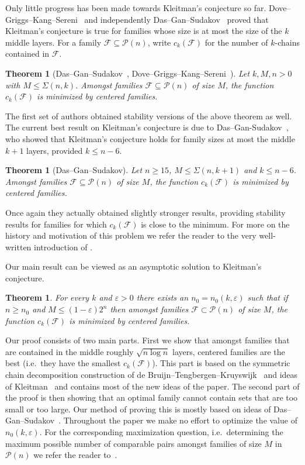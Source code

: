 \documentclass[12pt]{article}
\newtheorem{thm}[theorem]{Theorem}
\numberwithin{equation}{section}
\def\F{\mathcal{F}}
\def\P{\mathcal{P}}
\def\eps{\varepsilon}
\begin{document}
Only little progress has been made towards Kleitman's conjecture so far. Dove--Griggs--Kang--Sereni~\cite{griggs} and independently Das--Gan--Sudakov~\cite{dasgansuda} proved that Kleitman's conjecture is true for families whose size is at most the size of the $k$ middle layers. For a family $\F\subseteq \P(n)$, write $c_k(\F)$ for the number of $k$-chains contained in $\F$.
\begin{thm}[Das--Gan--Sudakov~\cite{dasgansuda}, Dove--Griggs--Kang--Sereni~\cite{griggs}]
Let $k,M,n>0$ with $M\leq \Sigma(n,k)$. Amongst families $\F\subseteq \P(n)$ of size $M$, the function $c_k(\F)$ is minimized by centered families.
\end{thm}
The first set of authors obtained stability versions of the above theorem as well. The current best result on Kleitman's conjecture is due to Das--Gan-Sudakov~\cite{dasgansuda}, who showed that Kleitman's conjecture holds for family sizes at most the middle $k+1$ layers, provided $k\leq n-6$.
\begin{thm}[\label{dasgansudakovthm}Das--Gan--Sudakov]
Let $n\geq 15$, $M\leq \Sigma(n,k+1)$ and $k\leq n-6$. Amongst families $\F\subseteq \P(n)$ of size $M$, the function $c_k(\F)$ is minimized by centered families.
\end{thm}
Once again they actually obtained slightly stronger results, providing stability results for families for which $c_k(\F)$ is close to the minimum. For more on the history and motivation of this problem we refer the reader to the very well-written introduction of \cite{dasgansuda}. 

Our main result can be viewed as an asymptotic solution to Kleitman's conjecture.
\begin{thm}\label{mainthm}
For every $k$ and $\eps>0$ there exists an $n_0=n_0(k,\eps)$ such that if $n\geq n_0$ and $M\leq (1-\eps)2^n$ then amongst families $\F\subset \P(n)$ of size $M$,  the function $c_k(\F)$ is minimized by centered families.
\end{thm}
Our proof consists of two main parts. First we show that amongst families that are contained in the middle roughly $\sqrt{n\log n}$ layers, centered families are the best (i.e.~they have the smallest $c_k(\F)$). This part is based on the symmetric chain decomposition construction of de Bruijn--Tengbergen--Kruyswijk~\cite{scd} and ideas of Kleitman~\cite{kleitmanpermu} and contains most of the new ideas of the paper. The second part of the proof is then showing that an optimal family cannot contain sets that are too small or too large. Our method of proving this is mostly based on ideas of Das--Gan--Sudakov~\cite{dasgansuda}. Throughout the paper we make no effort to optimize the value of $n_0(k,\eps)$. For the corresponding maximization question, i.e.~determining the maximum possible number of comparable pairs amongst families of size $M$ in $\P(n)$ we refer the reader to~\cite{alonmaxim}.
\end{document}
